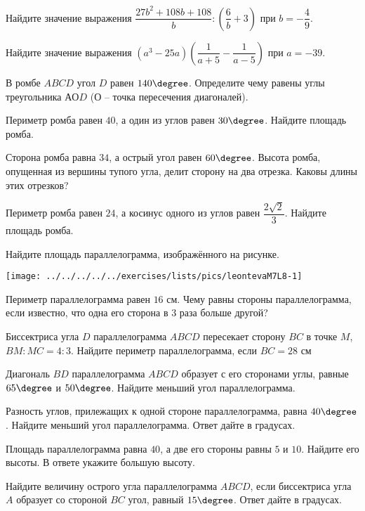 \begin{class}[number=8]
	\begin{listofex}
		\item Найдите значение выражения   \( \dfrac{27b^{2}+108b+108}{b}:\left( \dfrac{6}{b}+3 \right) \) при \( b = - \dfrac{4}{9}\). 
		\item Найдите значение выражения \( (a^{3}-25a )\left( \dfrac{1}{a+5}-\dfrac{1}{a-5} \right)\) при \( a =-39 \).
		\item В ромбе \( ABCD \) угол \( D \) равен \( 140\degree \). Определите чему равены углы треугольника \( АОD \) (\( О \) – точка пересечения диагоналей).
		\item Периметр ромба равен \( 40 \), а один из углов равен \( 30\degree \). Найдите площадь ромба.
		\item Сторона ромба равна \( 34 \), а острый угол равен \( 60\degree \). Высота ромба, опущенная из вершины тупого угла, делит сторону на два отрезка. Каковы длины этих отрезков?
		\item Периметр ромба равен \( 24 \), а косинус одного из углов равен  \( \dfrac{2 \sqrt{2}}{3} \).  Найдите площадь ромба.
		\item \begin{minipage}[t]{\bodywidth}
			Найдите площадь параллелограмма, изображённого на рисунке.
		\end{minipage}
		\hspace{0.02\linewidth}
		\begin{minipage}[t]{\picwidth}
			\texttt{[image: ../../../../../exercises/lists/pics/leontevaM7L8-1]}
		\end{minipage}
		\item Периметр параллелограмма равен \( 16 \) см. Чему равны стороны параллелограмма, если известно, что одна его сторона в \( 3 \) раза больше другой?
		\item Биссектриса угла \( D \) параллелограмма \( ABCD \) пересекает сторону \( BC \) в точке \( M \), \( BM:MC = 4:3 \). Найдите периметр параллелограмма, если \( BC = 28 \) см
		\item Диагональ \( BD \) параллелограмма \( ABCD \) образует с его сторонами углы, равные \( 65\degree \) и \( 50\degree \). Найдите меньший угол параллелограмма.
		\item Разность углов, прилежащих к одной стороне параллелограмма, равна \( 40\degree \). Найдите меньший угол параллелограмма. Ответ дайте в градусах.
		\item Площадь параллелограмма равна \( 40 \), а две его стороны равны \( 5 \) и \( 10 \). Найдите его высоты. В ответе укажите большую высоту.
		\item Найдите величину острого угла параллелограмма \( ABCD \), если биссектриса угла \( A \) образует со стороной \( BC \) угол, равный \( 15\degree \). Ответ дайте в градусах.
	\end{listofex}
\end{class}


